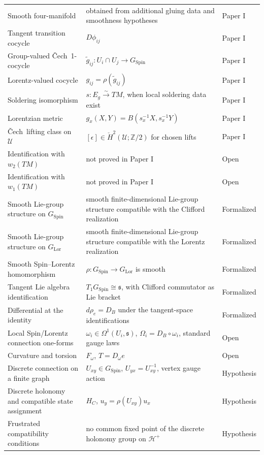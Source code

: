 \documentclass[11pt,a4paper]{article}
\theoremstyle{remark}
\newcommand{\Ztwo}{\mathbb{Z}/2}
\newcommand{\SpinG}{G_{\mathrm{Spin}}}
\newcommand{\LorG}{G_{\mathrm{Lor}}}
\newcommand{\Cech}{\ifmmode\text{\v{C}ech}\else\v{C}ech\fi}
\newcommand{\cU}{\mathcal U}
\newcommand{\statusPaper}{\textsf{Paper I}}
\newcommand{\statusFormal}{\textsf{Formalized}}
\newcommand{\statusHypothesis}{\textsf{Hypothesis}}
\newcommand{\statusOpen}{\textsf{Open}}
\begin{document}
\begin{longtable}{@{}L{0.26\textwidth}L{0.47\textwidth}L{0.13\textwidth}@{}}
Smooth four-manifold & obtained from additional gluing data and smoothness hypotheses & \statusPaper \\
Tangent transition cocycle & \(D\phi_{ij}\) & \statusPaper \\
Group-valued \Cech\ 1-cocycle & \(\widetilde g_{ij}:U_i\cap U_j\to\SpinG\) & \statusPaper \\
Lorentz-valued cocycle & \(g_{ij}=\rho(\widetilde g_{ij})\) & \statusPaper \\
Soldering isomorphism & \(s:E_g\xrightarrow{\sim}TM\), when local soldering data exist & \statusPaper \\
Lorentzian metric & \(g_x(X,Y)=B(s_x^{-1}X,s_x^{-1}Y)\) & \statusPaper \\
\Cech\ lifting class on \(\cU\) & \([\epsilon]\in\check H^2(\cU;\Ztwo)\) for chosen lifts & \statusPaper \\
Identification with \(w_2(TM)\) & not proved in Paper I & \statusOpen \\
Identification with \(w_1(TM)\) & not proved in Paper I & \statusOpen \\
Smooth Lie-group structure on \(\SpinG\) & smooth finite-dimensional Lie-group structure compatible with the Clifford realization & \statusFormal \\
Smooth Lie-group structure on \(\LorG\) & smooth finite-dimensional Lie-group structure compatible with the Lorentz realization & \statusFormal \\
Smooth Spin--Lorentz homomorphism & \(\rho:\SpinG\to\LorG\) is smooth & \statusFormal \\
Tangent Lie algebra identification & \(T_1\SpinG\cong\mathfrak s\), with Clifford commutator as Lie bracket & \statusFormal \\
Differential at the identity & \(d\rho_e=D_B\) under the tangent-space identifications & \statusFormal \\
Local Spin/Lorentz connection one-forms & \(\omega_i\in\Omega^1(U_i,\mathfrak s)\), \(\Omega_i=D_B\circ\omega_i\), standard gauge laws & \statusOpen \\
Curvature and torsion & \(F_\omega\), \(T=D_\omega e\) & \statusOpen \\
Discrete connection on a finite graph & \(U_{xy}\in\SpinG\), \(U_{yx}=U_{xy}^{-1}\), vertex gauge action & \statusHypothesis \\
Discrete holonomy and compatible state assignment & \(H_C\), \(u_y=\rho(U_{xy})u_x\) & \statusHypothesis \\
Frustrated compatibility conditions & no common fixed point of the discrete holonomy group on \(\mathcal H^+\) & \statusHypothesis \\

\end{longtable}
\end{document}
